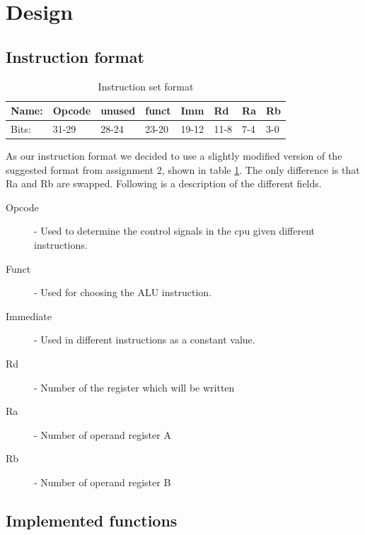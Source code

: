 \documentclass[11pt]{report}
\begin{document}
\section*{Design}

\subsection*{Instruction format}

\begin{table}[h]
  \centering
  \begin{tabular}{|l|l|l|l|l|l|l|l|}
    \hline
    Name: 		&	Opcode		&	unused	&	funct	&	Imm		&	Rd		&	Ra	&	Rb	\\\hline
    Bits: 		&	31-29		&	28-24	&	23-20	&	19-12	&	11-8	&	7-4	&	3-0	\\\hline
  \end{tabular}
  \caption{Instruction set format}
  \label{tab:instformat}
\end{table}

As our instruction format we decided to use a slightly modified version of the
suggested format from assignment 2, shown in table \ref{tab:instformat}. The only
difference is that Ra and Rb are swapped. Following is a description of the different
fields.

\begin{description}
\item[Opcode] - Used to determine the control signals in the cpu given different instructions.	
\item[Funct] - Used for choosing the ALU instruction.
\item[Immediate] - Used in different instructions as a constant value.
\item[Rd] - Number of the register which will be written
\item[Ra] - Number of operand register A
\item[Rb] - Number of operand register B
\end{description}



\subsection*{Implemented functions}
\end{document}
